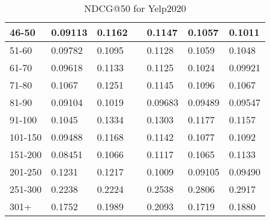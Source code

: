\begin{table*}[]
\begin{tabular}{|l|l|l|l|l|l|l|}
    46-50   & 0.09113                        & 0.1162                         &                                & 0.1147                         & 0.1057                         & 0.1011                         \\ \hline
    51-60   & 0.09782                        & 0.1095                         &                                & 0.1128                         & 0.1059                         & 0.1048                         \\ \hline
    61-70   & 0.09618                        & 0.1133                         &                                & 0.1125                         & 0.1024                         & 0.09921                        \\ \hline
    71-80   & 0.1067                         & 0.1251                         &                                & 0.1145                         & 0.1096                         & 0.1067                         \\ \hline
    81-90   & 0.09104                        & 0.1019                         &                                & 0.09683                        & 0.09489                        & 0.09547                        \\ \hline
    91-100  & 0.1045                         & 0.1334                         &                                & 0.1303                         & 0.1177                         & 0.1157                         \\ \hline
    101-150 & 0.09488                        & 0.1168                         &                                & 0.1142                         & 0.1077                         & 0.1092                         \\ \hline
    151-200 & 0.08451                        & 0.1066                         &                                & 0.1117                         & 0.1065                         & 0.1133                         \\ \hline
    201-250 & 0.1231                         & 0.1217                         &                                & 0.1009                         & 0.09105                        & 0.09490                        \\ \hline
    251-300 & 0.2238                         & 0.2224                         &                                & 0.2538                         & 0.2806                         & 0.2917                         \\ \hline
    301+    & 0.1752                         & 0.1989                         &                                & 0.2093                         & 0.1719                         & 0.1880                         \\ \hline
    \end{tabular}
    \caption{NDCG@50 for Yelp2020}
    \label{tab:yelp2020-ndcg-evaluation}
\end{table*}
